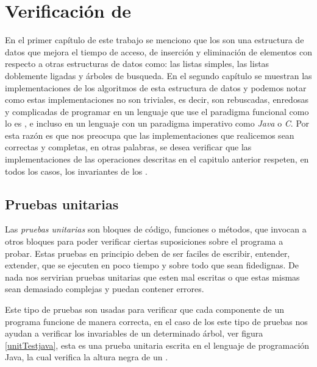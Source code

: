 \chapter{Verificación de {\arns}}

En el primer cap\'itulo de este trabajo se menciono que los {\arns} son una estructura de datos
que mejora el tiempo de acceso, de inserción y eliminación de elementos con respecto a otras
estructuras de datos como: las listas simples, las listas doblemente ligadas y \'arboles de
busqueda. En el segundo cap\'itulo se muestran las implementaciones de los algoritmos de esta
estructura de datos y podemos notar como estas implementaciones no son triviales, es decir, son
rebuscadas, enredosas y complicadas de programar en un lenguaje que use el paradigma funcional como
lo es {\coq}, e incluso en un lenguaje con un paradigma imperativo como \textit{Java} o \textit{C}.
Por esta razón es que nos preocupa que las implementaciones que realicemos sean correctas y
completas, en otras palabras, se desea verificar que las implementaciones de las operaciones
descritas en el capitulo anterior respeten, en todos los casos, los invariantes de los {\arns}.

\section{Pruebas unitarias}
Las \textit{pruebas unitarias} \cite{unittest} son bloques de c\'odigo, funciones o m\'etodos, que
invocan a otros bloques para poder verificar ciertas suposiciones sobre el programa a probar. Estas
pruebas en principio deben de ser faciles de escribir, entender, extender, que se ejecuten en poco
tiempo y sobre todo que sean fidedignas. De nada nos servirian pruebas unitarias que esten mal
escritas o que estas mismas sean demasiado complejas y puedan contener errores.

Este tipo de pruebas son usadas para verificar que cada componente de un programa funcione de
manera correcta, en el caso de los {\arns} este tipo de pruebas nos ayudan a verificar los
invariables de un determinado \'arbol, ver figura \ref{unitTestjava}, esta es una prueba unitaria
escrita en el lenguaje de programaci\'on Java, la cual verifica la altura negra de un {\arn}.

